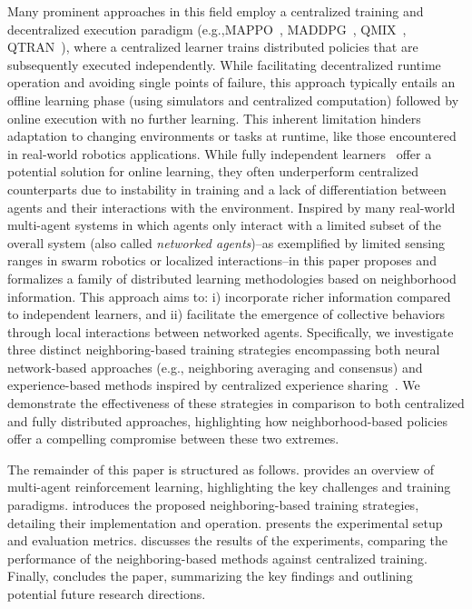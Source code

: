 \documentclass[sigconf]{acmart}
\begin{document}
\sloppy
Many prominent approaches in this field employ a centralized training and decentralized execution paradigm
 (e.g.,MAPPO~\cite{yu2022surprising}, MADDPG~\cite{DBLP:conf/nips/LoweWTHAM17}, QMIX~\cite{DBLP:conf/icml/RashidSWFFW18}, QTRAN~\cite{DBLP:conf/icml/SonKKHY19}), 
 where a centralized learner trains distributed policies that are subsequently executed independently. 
%
While facilitating decentralized runtime operation and avoiding single points of failure, 
 this approach typically entails an offline learning phase (using simulators and centralized computation) 
 followed by online execution with no further learning. 
 This inherent limitation hinders adaptation to changing environments or tasks at runtime, like those encountered in real-world robotics applications.  
% 
While fully independent learners~\cite{abed2016comparison} offer a potential solution for online learning,
 they often underperform centralized counterparts due to instability in training and a lack of differentiation between agents and their interactions with the environment. 
%
Inspired by many real-world multi-agent systems in which 
 agents only interact with a limited subset of the overall system (also called \emph{networked agents})--as exemplified by limited sensing ranges in swarm robotics or localized interactions--in this paper proposes and formalizes a family of distributed learning methodologies based on neighborhood information.
This approach aims to: 
i) incorporate richer information compared to independent learners, and
ii) facilitate the emergence of collective behaviors through local interactions between networked agents.
Specifically, we investigate three distinct neighboring-based training strategies encompassing both neural network-based approaches 
(e.g., neighboring averaging and consensus) 
and experience-based methods inspired by centralized experience sharing~\cite{DBLP:conf/nips/ChristianosSA20}. 
We demonstrate the effectiveness of these strategies in comparison to both centralized and fully distributed approaches, 
highlighting how neighborhood-based policies offer a compelling compromise between these two extremes.

The remainder of this paper is structured as follows.
 provides an overview of multi-agent reinforcement learning,
highlighting the key challenges and training paradigms.
 introduces the proposed neighboring-based training strategies,
detailing their implementation and operation.
 presents the experimental setup and evaluation metrics.
 discusses the results of the experiments,
comparing the performance of the neighboring-based methods against centralized training.
Finally,  concludes the paper,
summarizing the key findings and outlining potential future research directions.
\end{document}
